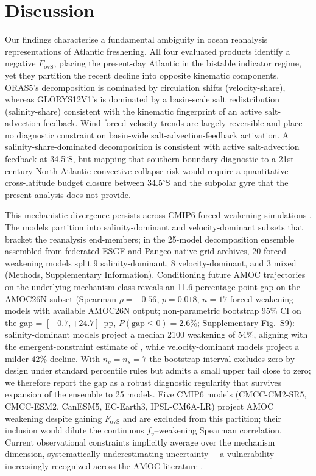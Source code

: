 \documentclass[11pt,a4paper]{article}
\begin{document}
\section*{Discussion}

Our findings characterise a fundamental ambiguity in ocean reanalysis representations of Atlantic freshening. All four evaluated products identify a negative \(F_{\mathrm{ovS}}\), placing the present-day Atlantic in the bistable indicator regime, yet they partition the recent decline into opposite kinematic components. ORAS5's decomposition is dominated by circulation shifts (velocity-share), whereas GLORYS12V1's is dominated by a basin-scale salt redistribution (salinity-share) consistent with the kinematic fingerprint of an active salt-advection feedback. Wind-forced velocity trends are largely reversible \citep{Chemke2021} and place no diagnostic constraint on basin-wide salt-advection-feedback activation. A salinity-share-dominated decomposition is consistent with active salt-advection feedback at 34.5$^\circ$S, but mapping that southern-boundary diagnostic to a 21st-century North Atlantic convective collapse risk would require a quantitative cross-latitude budget closure between 34.5$^\circ$S and the subpolar gyre that the present analysis does not provide.

This mechanistic divergence persists across CMIP6 forced-weakening simulations \citep{Sgubin2017, IPCC_AR6_Chapter9}. The models partition into salinity-dominant and velocity-dominant subsets that bracket the reanalysis end-members; in the 25-model decomposition ensemble assembled from federated ESGF and Pangeo native-grid archives, 20 forced-weakening models split 9 salinity-dominant, 8 velocity-dominant, and 3 mixed (Methods, Supplementary Information). Conditioning future AMOC trajectories on the underlying mechanism class reveals an 11.6-percentage-point gap on the AMOC26N subset (Spearman $\rho = -0.56$, $p = 0.018$, $n = 17$ forced-weakening models with available AMOC26N output; non-parametric bootstrap 95\% CI on the gap = $[-0.7, +24.7]$~pp, $P(\mathrm{gap}\leq 0) = 2.6\%$; Supplementary Fig.~S9): salinity-dominant models project a median 2100 weakening of 54\%, aligning with the emergent-constraint estimate of \citet{Portmann2026}, while velocity-dominant models project a milder 42\% decline. With $n_v = n_s = 7$ the bootstrap interval excludes zero by design under standard percentile rules but admits a small upper tail close to zero; we therefore report the gap as a robust diagnostic regularity that survives expansion of the ensemble to 25 models. Five CMIP6 models (CMCC-CM2-SR5, CMCC-ESM2, CanESM5, EC-Earth3, IPSL-CM6A-LR) project AMOC weakening despite gaining $F_{\mathrm{ovS}}$ and are excluded from this partition; their inclusion would dilute the continuous $f_v$--weakening Spearman correlation. Current observational constraints implicitly average over the mechanism dimension, systematically underestimating uncertainty\,---\,a vulnerability increasingly recognized across the AMOC literature \citep{RahmstorfCaesar2026, Jackson2025}.
\end{document}

